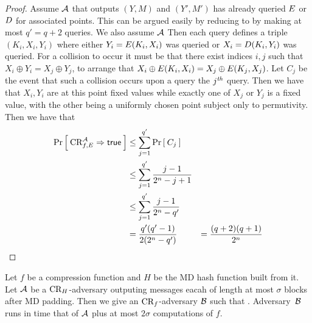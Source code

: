 \begin{proof}
Assume ${\mathcal A}$ that outputs $(Y,M)$ and $(Y',M')$ has already queried $E$
or $D$ for associated points. This can be argued easily by reducing to
by making at most $q' = q+2$ queries. We also assume
${\mathcal A}$  Then each query defines a triple 
$(K_i,X_i,Y_i)$ where either $Y_i = E(K_i,X_i)$ was queried or $X_i =
D(K_i,Y_i)$ was queried. For a collision to occur it must be that there
exist indices $i,j$ such that $X_i \oplus Y_i = X_j \oplus Y_j$, to arrange that
$X_i \oplus E(K_i,X_i) = X_j \oplus E(K_j,X_j)$. Let $C_j$ be the
event that such a collision occurs upon a query the $j^{\textit{th}}$ query. Then we have
that $X_i,Y_i$ are at this point fixed values while exactly one of $X_j$ or
$Y_j$ is a fixed value, with the other being a uniformly chosen point subject
only to permutivity. Then we have that 
\begin{align*}
\Pr\left[\: \textnormal{CR}_{f,E}^{\mathcal A}\Rightarrow\mathsf{true} \:\right] 
  &\le \sum_{j=1}^{q'} \Pr\left[\: C_j \:\right]   \\
  &\le \sum_{j=1}^{q'} \frac{j-1}{2^n-j+1}\\
  &\le \sum_{j=1}^{q'} \frac{j-1}{2^n-q'}\\
  &= \frac{q'(q'-1)}{2(2^n-q')}
  &= \frac{(q+2)(q+1)}{2^n} 
\end{align*}
\end{proof}


\begin{theorem*}
Let $f$ be a compression function and $H$ be the MD hash function built from it. 
Let ${\mathcal A}$ be a $\textnormal{CR}_H$-adversary outputing messages eacah of length at most $\sigma$
blocks after MD padding. Then we give an $\textnormal{CR}_f$-adversary ${\mathcal B}$
such that
\bnm
   \le {} \;.
\enm
Adversary~${\mathcal B}$ runs in time that of ${\mathcal A}$ plus at most $2\sigma$ computations of
$f$.
\end{theorem*}


